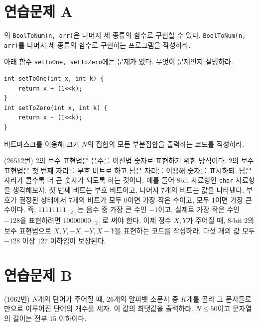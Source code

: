 \section{연습문제 A}
\begin{problem}
    의 \texttt{BoolToNum(n, arr)}은 나머지 세 종류의 함수로 구현할 수 있다. \texttt{BoolToNum(n, arr)}를 나머지 세 종류의 함수로 구현하는 프로그램을 작성하라.
\end{problem}
\begin{problem}
    아래 함수 \texttt{setToOne, setToZero}에는 문제가 있다. 무엇이 문제인지 설명하라.
\begin{lstlisting}
int setToOne(int x, int k) {
    return x + (1<<k);
}
int setToZero(int x, int k) {
    return x - (1<<k);
}
\end{lstlisting}
\end{problem}
\begin{problem} \label{pb: bitmask-subset}
    비트마스크를 이용해 크기 $N$의 집합의 모든 부분집합을 출력하는 코드를 직성하라.
\end{problem}

\begin{problem}
    (26512번) 2의 보수 표현법은 음수를 이진법 숫자로 표현하기 위한 방식이다. 2의 보수 표현법은 첫 번째 자리를 부호 비트로 하고 남은 자리를 이용해 숫자를 표시하되, 남은 자리가 클수록 더 큰 숫자가 되도록 하는 것이다.
    예를 들어 8bit 자료형인 \texttt{char} 자료형을 생각해보자. 첫 번째 비트는 부호 비트이고, 나머지 7개의 비트는 값을 나타낸다. 부호가 결정된 상태에서 7개의 비트가 모두 0이면 가장 작은 수이고, 모두 1이면 가장 큰 수이다. 즉, $11111111_{(2)}$는 음수 중 가장 큰 수인 $-1$이고, 실제로 가장 작은 수인 $-128$을 표현하려면 $10000000_{(2)}$로 써야 한다.
    이제 정수 $X, Y$가 주어질 때, 8-bit 2의 보수 표현법으로 $X, Y, -X, -Y, X-Y$를 표현하는 코드를 작성하라. 다섯 개의 값 모두 $-128$ 이상 $127$ 이하임이 보장된다.
\end{problem}

\section{연습문제 B}

\begin{problem}
    (1062번) $N$개의 단어가 주어질 때, 26개의 알파벳 소문자 중 $K$개를 골라 그 문자들로만으로 이루어진 단어의 개수를 세자. 이 값의 최댓값을 출력하라. $N \leq 50$이고 문자열의 길이는 전부 $15$ 이하이다.
\end{problem}

